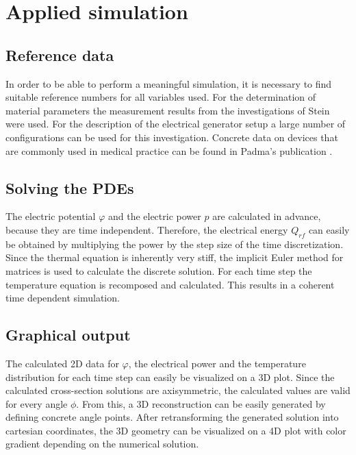 \documentclass[parskip=half, titlepage=yes, 12pt, BCOR=12mm, DIV=calc]{scrartcl}
\begin{document}


\section{Applied simulation}

\subsection{Reference data}
In order to be able to perform a meaningful simulation, it is necessary to find suitable reference numbers for all variables used. For the determination of material parameters the measurement results from the investigations of Stein \cite{stein} were used. For the description of the electrical generator setup a large number of configurations can be used for this investigation. Concrete data on devices that are commonly used in medical practice can be found in Padma's publication \cite{padma}. 

\subsection{Solving the PDEs}
The electric potential $\varphi$ and the electric power $p$ are calculated in advance, because they are time independent. Therefore, the electrical energy $Q_{rf}$ can easily be obtained by multiplying the power by the step size of the time discretization. Since the thermal equation is inherently very stiff, the implicit Euler method for matrices is used to calculate the discrete solution. For each time step the temperature equation is recomposed and calculated. This results in a coherent time dependent simulation.


\subsection{Graphical output}
The calculated 2D data for $\varphi$, the electrical power and the temperature distribution for each time step can easily be visualized on a 3D plot. Since the calculated cross-section solutions are axisymmetric, the calculated values are valid for every angle $\phi$. From this, a 3D reconstruction can be easily generated by defining concrete angle points. After retransforming the generated solution into cartesian coordinates, the 3D geometry can be visualized on a 4D plot with color gradient depending on the numerical solution.



\end{document}
